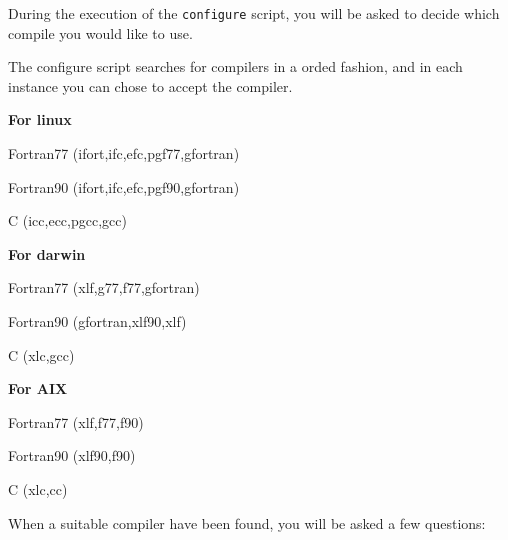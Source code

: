 During the execution of the \verb|configure| script, you will be
asked to decide which compile you would like to use. 

The configure script searches for compilers in a orded fashion, and in each instance you can chose to accept the compiler. 

{\bf For linux}
\begin{description}
\item{Fortran77} (ifort,ifc,efc,pgf77,gfortran)
\item{Fortran90} (ifort,ifc,efc,pgf90,gfortran)
\item{C} (icc,ecc,pgcc,gcc)
\end{description}

{\bf For darwin}
\begin{description}
\item{Fortran77} (xlf,g77,f77,gfortran)
\item{Fortran90} (gfortran,xlf90,xlf)
\item{C} (xlc,gcc)
\end{description}

{\bf For AIX}
\begin{description}
\item{Fortran77} (xlf,f77,f90)
\item{Fortran90} (xlf90,f90)
\item{C} (xlc,cc)
\end{description}

When a suitable compiler have been found, you will be asked a few questions:


